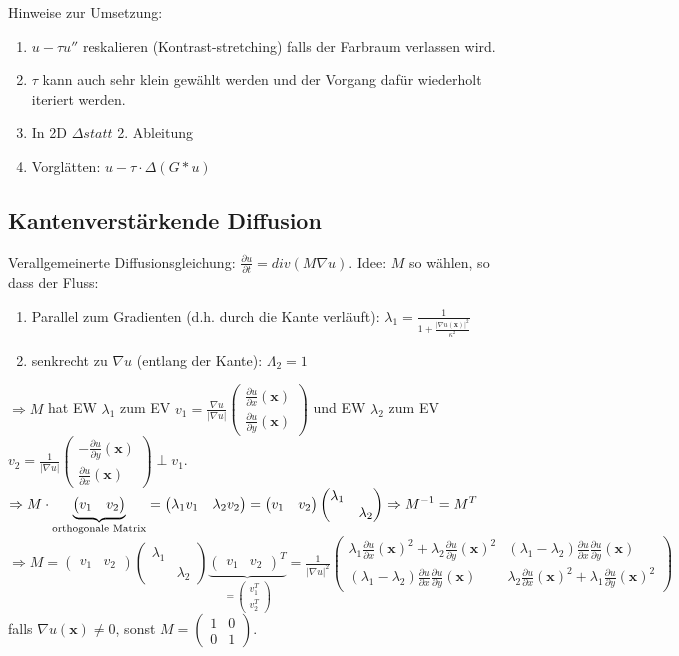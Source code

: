 \documentclass[ngerman]{article}
\theoremstyle{plain}
\theoremstyle{definition}
\numberwithin{equation}{section}
\newcommand{\abs}[1] {
\left| #1 \right|
}
\newcommand{\srmatrix}[1] {
\left( \begin{smallmatrix} #1 \end{smallmatrix} \right)
}
\newcommand{\C}[0]{
    \cdot
}
\newcommand{\x}[0] {
  \boldsymbol{x}
}
\newcommand{\mat}[1] {
\begin{pmatrix} #1 \end{pmatrix}
}
\begin{document}
            Hinweise zur Umsetzung:
            \begin{enumerate}[label=-]
                \item $u - \tau u''$ reskalieren (Kontrast-stretching) falls der Farbraum verlassen wird.
                \item $\tau$ kann auch sehr klein gewählt werden und der Vorgang dafür wiederholt iteriert werden.
                \item In 2D $\Delta statt$ 2. Ableitung
                \item Vorglätten: $u - \tau \C \Delta (G*u)$
            \end{enumerate}

            \subsection{Kantenverstärkende Diffusion}
                Verallgemeinerte Diffusionsgleichung: $\displaystyle \frac{\partial u}{\partial t} = div(M \nabla u)$.
                Idee: $M$ so wählen, so dass der Fluss:
                \begin{enumerate}[label=-]
                    \item Parallel zum Gradienten (d.h. durch die Kante verläuft): $\displaystyle \lambda_1=\frac{1}{1+\frac{\abs{\nabla u (\x)}^2}{\kappa^2}}$
                    \item senkrecht zu $\nabla u$ (entlang der Kante): $\Lambda_2=1$
                \end{enumerate}

                $\Rightarrow M$ hat EW $\lambda_1$ zum EV $\displaystyle v_1= \frac{\nabla u}{\abs{\nabla u}}\srmatrix{\frac{\partial u}{\partial x}(\x)\\\frac{\partial u}{\partial y}(\x)}$ und EW $\lambda_2$ zum EV $\displaystyle v_2 = \frac{1}{\abs{\nabla u}} \srmatrix{-\frac{\partial u}{\partial y}(\x)\\\frac{\partial u}{\partial x}(\x)} \perp v_1$.\\
                $\displaystyle \Rightarrow M \C \underbrace{\mat{v_1 & v_2}}_{\small \text{orthogonale Matrix}} = \mat{\lambda_1 v_1 & \lambda_2 v_2} = \mat{v_1 & v_2} \mat{\lambda_1 & \ \\ \ & \lambda_2} \Rightarrow M^{-1} = M^T$\\
                $\Rightarrow M= \mat{v_1 & v_2} \mat{\lambda_1 & \ \\ \ & \lambda_2} \underbrace{\mat{v_1 & v_2}^T}_{=\mat{v_1^T \\ v_2^T}} = \frac{1}{\abs{\nabla u}^2} \mat{\lambda_1 \frac{\partial u}{\partial x}(\x)^2 + \lambda_2 \frac{\partial u}{\partial y}(\x)^2  & (\lambda_1 - \lambda_2)\frac{\partial u}{\partial x} \frac{\partial u}{\partial y}(\x)\\ (\lambda_1 - \lambda_2)\frac{\partial u}{\partial x} \frac{\partial u}{\partial y}(\x) & \lambda_2 \frac{\partial u}{\partial x}(\x)^2 + \lambda_1 \frac{\partial u}{\partial y}(\x)^2}$\\
                falls $\nabla u(\x) \neq 0$, sonst $M= \mat{1 & 0 \\ 0 & 1}$.
\end{document}
